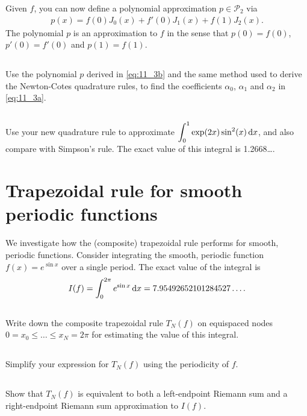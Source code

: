 \documentclass[11pt,letterpaper]{report}
\begin{document}
Given $f$, you can now define a polynomial approximation $p\in \mathcal{P}_2$ via 
\begin{align}
    p(x)=f(0)J_0(x)+f'(0)J_1(x)+f(1)J_2(x). \label{eq:11_3b}
\end{align}
The polynomial $p$ is an approximation to $f$ in the sense that
$p(0)=f(0)$, $p'(0)=f'(0)$ and $p(1)=f(1)$. 

\subsection{}
Use the polynomial
  $p$ derived in \eqref{eq:11_3b} and the same method used to derive the Newton-Cotes
  quadrature rules, to find the coefficients $\alpha_0$, $\alpha_1$ and
  $\alpha_2$ in \eqref{eq:11_3a}.
  
\subsection{}
Use your new quadrature rule to approximate
  $\displaystyle{\int_0^1\exp(2x)\sin^2(x)\,\mathrm{d}x}$, and also compare with
  Simpson's rule. The exact value of this integral is 1.2668\dots.


\section{Trapezoidal rule for smooth periodic functions}

We investigate how the (composite) trapezoidal rule performs for smooth, periodic functions. Consider integrating the smooth, periodic function $f(x) = e^{\sin x}$ over a single period. The exact value of the integral is
\[
I(f) = \int_0^{2\pi} e^{\sin x} \, \mathrm{d} x = 7.95492652101284527\dots.
\]

\subsection{}
Write down the composite trapezoidal rule $T_N(f)$ on equispaced nodes $0=x_0 \le  \dots \le x_N = 2\pi$ for estimating the value of this integral. 

\subsection{}
Simplify your expression for $T_N(f)$ using the periodicity of $f$.

\subsection{}
Show that $T_N(f)$ is equivalent to both a left-endpoint Riemann sum and a right-endpoint Riemann sum approximation to $I(f)$.
\end{document}
